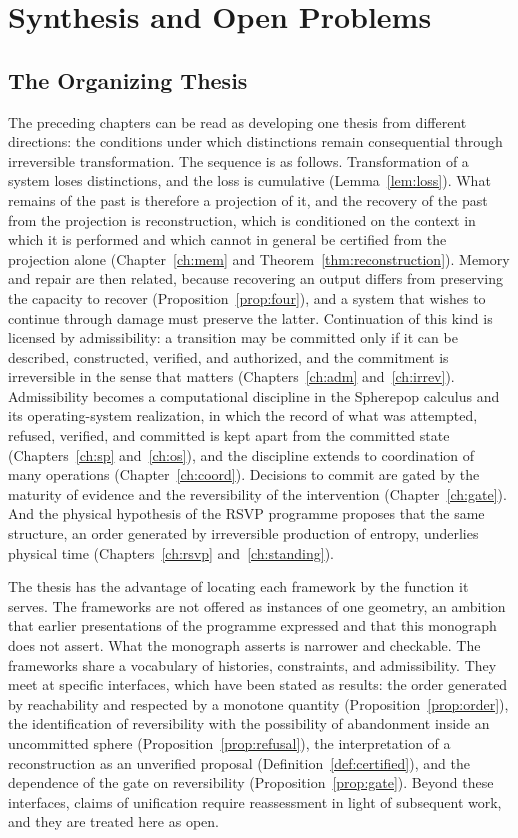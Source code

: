 \documentclass[11pt,twoside,openright]{book}
\theoremstyle{plain}
\theoremstyle{definition}
\theoremstyle{remark}
\newcommand{\rsvp}{RSVP}
\begin{document}
\chapter{Synthesis and Open Problems}
\label{ch:synth}

\section{The Organizing Thesis}

The preceding chapters can be read as developing one thesis from different directions: the conditions under which distinctions remain consequential through irreversible transformation. The sequence is as follows. Transformation of a system loses distinctions, and the loss is cumulative (Lemma~\ref{lem:loss}). What remains of the past is therefore a projection of it, and the recovery of the past from the projection is reconstruction, which is conditioned on the context in which it is performed and which cannot in general be certified from the projection alone (Chapter~\ref{ch:mem} and Theorem~\ref{thm:reconstruction}). Memory and repair are then related, because recovering an output differs from preserving the capacity to recover (Proposition~\ref{prop:four}), and a system that wishes to continue through damage must preserve the latter. Continuation of this kind is licensed by admissibility: a transition may be committed only if it can be described, constructed, verified, and authorized, and the commitment is irreversible in the sense that matters (Chapters~\ref{ch:adm} and~\ref{ch:irrev}). Admissibility becomes a computational discipline in the Spherepop calculus and its operating-system realization, in which the record of what was attempted, refused, verified, and committed is kept apart from the committed state (Chapters~\ref{ch:sp} and~\ref{ch:os}), and the discipline extends to coordination of many operations (Chapter~\ref{ch:coord}). Decisions to commit are gated by the maturity of evidence and the reversibility of the intervention (Chapter~\ref{ch:gate}). And the physical hypothesis of the \rsvp{} programme proposes that the same structure, an order generated by irreversible production of entropy, underlies physical time (Chapters~\ref{ch:rsvp} and~\ref{ch:standing}).

The thesis has the advantage of locating each framework by the function it serves. The frameworks are not offered as instances of one geometry, an ambition that earlier presentations of the programme expressed and that this monograph does not assert. What the monograph asserts is narrower and checkable. The frameworks share a vocabulary of histories, constraints, and admissibility. They meet at specific interfaces, which have been stated as results: the order generated by reachability and respected by a monotone quantity (Proposition~\ref{prop:order}), the identification of reversibility with the possibility of abandonment inside an uncommitted sphere (Proposition~\ref{prop:refusal}), the interpretation of a reconstruction as an unverified proposal (Definition~\ref{def:certified}), and the dependence of the gate on reversibility (Proposition~\ref{prop:gate}). Beyond these interfaces, claims of unification require reassessment in light of subsequent work, and they are treated here as open.
\end{document}
